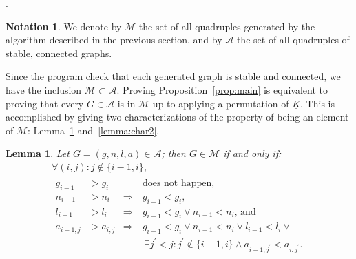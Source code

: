 \documentclass{amsart}
\theoremstyle{plain}
\newtheorem{lemma}[theorem]{Lemma}
\theoremstyle{definition}
\newtheorem{notation}[theorem]{Notation}
\newcommand{\ubar}[1]{\underline{#1}}
\begin{document}
  . %
  
  \begin{notation} We denote by
  $\mathcal{M}$ the set of all quadruples generated by the algorithm
  described in the previous section, and by $\mathcal{A}$ the set of
  all quadruples of stable, connected graphs.
\end{notation}
 
 
Since the program check that each generated graph is stable and connected, we have
the inclusion $\mathcal{M} \subset \mathcal{A}$. Proving
Proposition~\ref{prop:main} is equivalent to proving that every $G \in
\mathcal{A}$ is in $\mathcal{M}$ up to applying a permutation of
$\ubar{K}$. This is accomplished by giving two characterizations
of the property of being an element of $\mathcal{M}$: Lemma~\ref{lemma:char1} and~\ref{lemma:char2}.

\begin{lemma}\label{lemma:char1}
  Let $G = (g, n, l, a) \in \mathcal{A}$; then $G \in \mathcal{M}$ if
  and only if:
  \begin{multline*}
    \forall (i,j)\colon
    j \not\in \{i-1, i\},\\
    \begin{aligned}
      g_{i-1} &> g_i &&\text{does not happen,}\\
      n_{i-1} &> n_i &\Rightarrow\  & g_{i-1} < g_i\text{,}\\
      l_{i-1} &> l_i &\Rightarrow\  & g_{i-1} < g_i \vee n_{i-1} < n_i\text{, and}\\
      a_{i-1,j} &> a_{i,j} &\Rightarrow\ & g_{i-1} < g_i \vee n_{i-1}
      < n_i \vee l_{i-1} < l_i \vee\\
      &&&\ \exists j^\prime < j: j^\prime \not\in \{i-1,i\} \wedge
      a_{i-1,j^\prime} < a_{i,j^\prime}\text{.}
    \end{aligned}
  \end{multline*}
\end{lemma}
\end{document}
